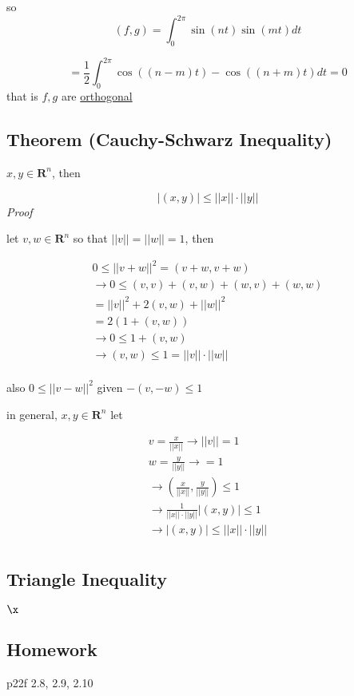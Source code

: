 \documentclass[
  12pt,
]{article}
\begin{document}
so \[(f,g) = \int_0^{2\pi} \sin(nt) \sin(mt) dt\]

\[= \frac{1}{2}\int_0^{2\pi} \cos((n-m)t) - \cos((n+m)t)dt = 0\] that is \(f, g\) are \ul{orthogonal}

\subsection{Theorem (Cauchy-Schwarz Inequality)}\label{theorem-cauchy-schwarz-inequality}

\(x, y \in \mathbf{R}^n\), then

\[|(x, y)| \leq ||x||\cdot ||y||\] \emph{Proof}

let \(v, w \in \mathbf{R}^n\) so that \(||v|| = ||w|| = 1\), then

\[
\begin{aligned}
0 \leq ||v+w||^2 = (v+w, v+w) \\
\rightarrow 0 \leq (v, v) + (v, w) + (w, v) + (w, w) \\
= ||v||^2 + 2(v, w) + ||w||^2 \\
= 2(1 + (v, w)) \\
\rightarrow 0 \leq 1 + (v, w) \\
\rightarrow (v, w) \leq 1 = ||v||\cdot || w|| \\
\end{aligned}
\]

also \(0 \leq ||v-w||^2\) given \(-(v, -w) \leq 1\)

in general, \(x, y \in \mathbf{R}^n\) let

\[
\begin{aligned}
v = \frac{x}{||x||} \rightarrow ||v|| =1 \\
w = \frac{y}{||y||} \rightarrow = 1 \\
\rightarrow \left(\frac{x}{||x||},\frac{y}{||y||}\right) \leq 1 \\
\rightarrow \frac{1}{||x|| \cdot ||y||} |(x, y)| \leq 1 \\
\rightarrow |(x, y)| \leq ||x|| \cdot ||y|| \\
\end{aligned}
\]

\subsection{Triangle Inequality}\label{triangle-inequality}

\(\x\)

\subsection{Homework}\label{homework}

p22f 2.8, 2.9, 2.10
\end{document}
